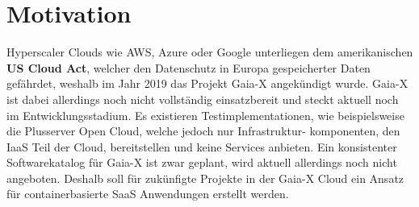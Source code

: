 \section{Motivation}
\label{sec:einleitung:motivation}
Hyperscaler Clouds wie \ac{AWS}, Azure oder Google unterliegen dem amerikanischen \textbf{US Cloud Act}, welcher
den Datenschutz in Europa gespeicherter Daten gefährdet\cite{Kagermann2021}, weshalb im Jahr 2019 das Projekt Gaia-X angekündigt wurde.
Gaia-X ist dabei allerdings noch nicht vollständig einsatzbereit und steckt aktuell noch im Entwicklungsstadium.
Es existieren Testimplementationen, wie beispielsweise die Plusserver Open Cloud, welche jedoch nur Infrastruktur-
komponenten, den \ac{IaaS} Teil der Cloud, bereitstellen und keine Services anbieten. Ein konsistenter Softwarekatalog für Gaia-X ist zwar geplant\cite{BMWi2019},
wird aktuell allerdings noch nicht angeboten. Deshalb soll für zukünfigte Projekte in der Gaia-X Cloud ein Ansatz
für containerbasierte \ac{SaaS} Anwendungen erstellt werden. 